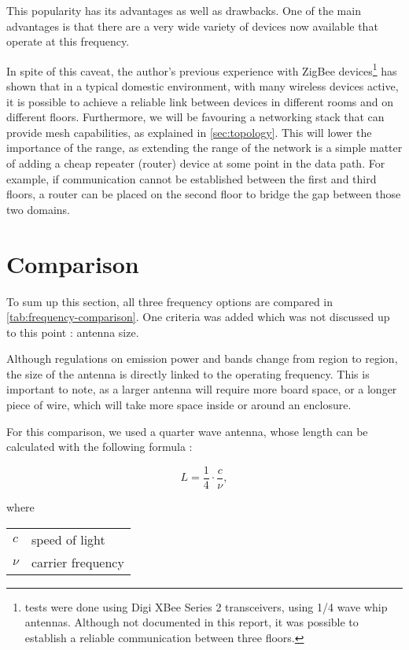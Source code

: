 This popularity has its advantages as well as drawbacks. One of the main
advantages is that there are a very wide variety of devices now available that
operate at this frequency. 

In spite of this caveat, the author's previous experience with ZigBee
devices\footnote{tests were done using Digi XBee Series 2 transceivers, using
1/4 wave whip antennas. Although not documented in this report, it was possible
to establish a reliable communication between three floors.}
has shown that in a typical domestic environment, with many wireless devices
active, it is possible to achieve a reliable link between devices in different
rooms and on different floors. Furthermore, we will be favouring a networking
stack that can provide mesh capabilities, as explained in
\autoref{sec:topology}. This will lower the importance of the range, as
extending the range of the network is a simple matter of adding a cheap repeater
(router) device at some point in the data path. For example, if communication
cannot be established between the first and third floors, a router can be placed
on the second floor to bridge the gap between those two domains.


\section{Comparison}

To sum up this section, all three frequency options are compared in
\autoref{tab:frequency-comparison}. One criteria was added which was not
discussed up to this point : antenna size.

Although regulations on emission power and bands change from region to region,
the size of the antenna is directly linked to the operating frequency. This is
important to note, as a larger antenna will require more board space, or
a longer piece of wire, which will take more space inside or around an
enclosure.

For this comparison, we used a quarter wave antenna, whose length can be
calculated with the following formula :

\begin{equation*}
  L = \frac{1}{4} \cdot \frac{c}{\nu},
\end{equation*}

where

\begin{tabular}[h!]{ll}
$c$   & speed of light  \\
$\nu$ & carrier frequency \\
\end{tabular}


